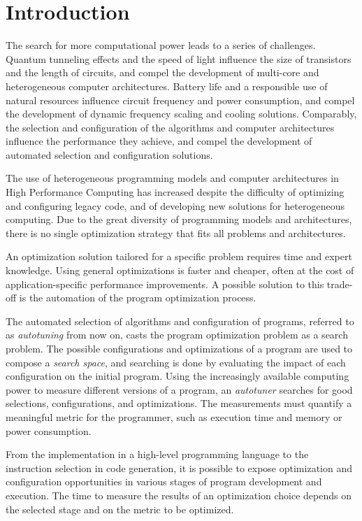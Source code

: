 \chapter{Introduction}
\label{chap:introduction}

The search for more computational power leads to a series of challenges.
Quantum tunneling effects and the speed of light influence the size of
transistors and the length of circuits, and compel the development of
multi-core and heterogeneous computer architectures.  Battery life and a
responsible use of natural resources influence circuit frequency and power
consumption, and compel the development of dynamic frequency scaling and
cooling solutions.  Comparably, the selection and configuration of the
algorithms and computer architectures influence the performance they achieve,
and compel the development of automated selection and configuration solutions.

The use of heterogeneous programming models and computer architectures in High
Performance Computing has increased despite the difficulty of optimizing and
configuring legacy code, and of developing new solutions for heterogeneous
computing. Due to the great diversity of programming models and architectures,
there is no single optimization strategy that fits all problems and
architectures.

An optimization solution tailored for a specific problem requires time and
expert knowledge. Using general optimizations is faster and cheaper, often at
the cost of application-specific performance improvements. A possible solution
to this trade-off is the automation of the program optimization process.

The automated selection of algorithms and configuration of programs, referred
to as \textit{autotuning} from now on, casts the program optimization problem
as a search problem. The possible configurations and optimizations of a program
are used to compose a \textit{search space}, and searching is done by
evaluating the impact of each configuration on the initial program.  Using the
increasingly available computing power to measure different versions of a
program, an \textit{autotuner} searches for good selections, configurations,
and optimizations. The measurements must quantify a meaningful metric for the
programmer, such as execution time and memory or power consumption.

From the implementation in a high-level programming language to the instruction
selection in code generation, it is possible to expose optimization and
configuration opportunities in various stages of program development and
execution.  The time to measure the results of an optimization choice depends
on the selected stage and on the metric to be optimized.

